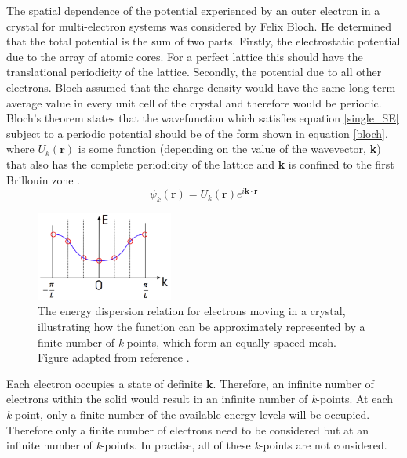 The spatial dependence of the potential experienced by an outer electron in a crystal 
for multi-electron systems was considered by Felix Bloch. He determined that the total 
potential is the sum of two parts. Firstly, the electrostatic potential due to the array 
of atomic cores. For a perfect lattice this should have the translational periodicity of 
the lattice. Secondly, the potential due to all other electrons. Bloch assumed that the 
charge density would have the same long-term average value in every unit cell of the 
crystal and therefore would be periodic. Bloch's theorem states that the wavefunction 
which satisfies equation \ref{single_SE} subject to a periodic potential should be of 
the form shown in equation \ref{bloch}, where $U_k(\mathbf{r})$ is some function 
(depending on the value of the wavevector, \textbf{k}) that also has the complete 
periodicity of the lattice and \textbf{k} is confined to the first Brillouin zone \cite{Blakemore2}.
\begin{equation} \label{bloch}
\psi_k(\mathbf{r}) = U_k(\mathbf{r}) e^{i\mathbf{k \cdot r}} 
\end{equation}
\begin{figure}[h!]
  \centering
    \includegraphics[width=0.4\textwidth]{figures/energy_dispersion.png}
    \caption{The energy dispersion relation for electrons moving in a crystal, illustrating how the function can be approximately represented by a finite number of \textit{k}-points, which form an equally-spaced mesh. Figure adapted from reference .}
  \label{energy_dispersion}
\end{figure}
Each electron occupies a state of definite $\mathbf{k}$. Therefore, an infinite number of electrons within the solid would result in an infinite number of \textit{k}-points. At each \textit{k}-point, only a finite number of the available energy levels will be occupied. Therefore only a finite number of electrons need to be considered but at an infinite number of \textit{k}-points. In practise, all of these \textit{k}-points are not considered. 
